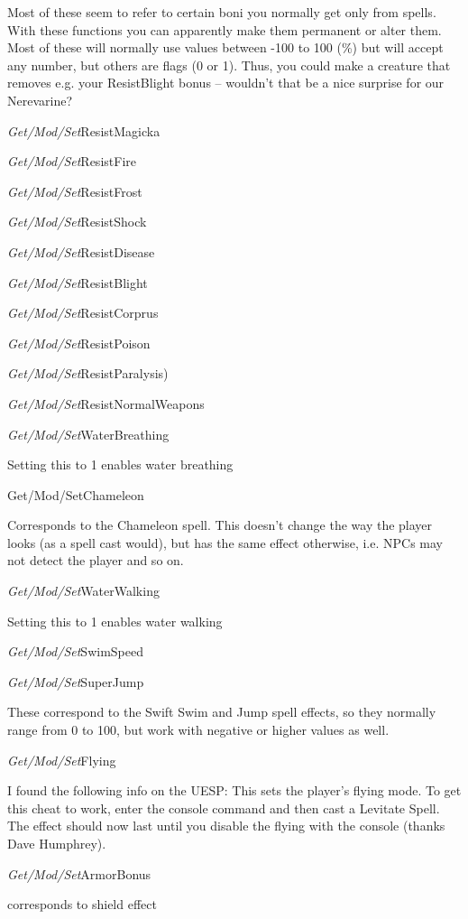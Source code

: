 \documentclass[
]{article}
\begin{document}
Most of these seem to refer to certain boni you normally get only from
spells. With these functions you can apparently make them permanent or
alter them. Most of these will normally use values between -100 to 100
(\%) but will accept any number, but others are flags (0 or 1). Thus,
you could make a creature that removes e.g. your ResistBlight bonus --
wouldn't that be a nice surprise for our Nerevarine?

\emph{Get/Mod/Set}ResistMagicka

\emph{Get/Mod/Set}ResistFire

\emph{Get/Mod/Set}ResistFrost

\emph{Get/Mod/Set}ResistShock

\emph{Get/Mod/Set}ResistDisease

\emph{Get/Mod/Set}ResistBlight

\emph{Get/Mod/Set}ResistCorprus

\emph{Get/Mod/Set}ResistPoison

\emph{Get/Mod/Set}ResistParalysis)

\emph{Get/Mod/Set}ResistNormalWeapons

\emph{Get/Mod/Set}WaterBreathing

Setting this to 1 enables water breathing

Get/Mod/SetChameleon

Corresponds to the Chameleon spell. This doesn't change the way the
player looks (as a spell cast would), but has the same effect otherwise,
i.e. NPCs may not detect the player and so on.

\emph{Get/Mod/Set}WaterWalking

Setting this to 1 enables water walking

\emph{Get/Mod/Set}SwimSpeed

\emph{Get/Mod/Set}SuperJump

These correspond to the Swift Swim and Jump spell effects, so they
normally range from 0 to 100, but work with negative or higher values as
well.

\emph{Get/Mod/Set}Flying

I found the following info on the UESP: This sets the player's flying
mode. To get this cheat to work, enter the console command and then cast
a Levitate Spell. The effect should now last until you disable the
flying with the console (thanks Dave Humphrey).

\emph{Get/Mod/Set}ArmorBonus

corresponds to shield effect
\end{document}
